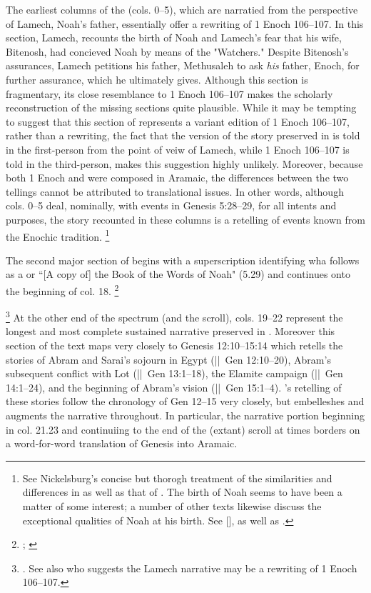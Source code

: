 The earliest columns of the \ga (cols. 0--5), which are narratied from the perspective of Lamech, Noah's father, essentially offer a rewriting of 1 Enoch 106--107.\autocite[174]{nickelsburg2005} In this section, Lamech, recounts the birth of Noah and Lamech's fear that his wife, Bitenosh, had concieved Noah by means of the  "Watchers." Despite Bitenosh's assurances, Lamech petitions his father, Methusaleh to ask \emph{his} father, Enoch, for further assurance, which he ultimately gives. Although this section is fragmentary, its close resemblance to 1 Enoch 106--107 makes the scholarly reconstruction of the missing sections quite plausible. While it may be tempting to suggest that this section of \ga represents a variant edition of 1 Enoch 106--107, rather than a rewriting, the fact that the version of the story preserved in \ga is told in the first-person from the point of veiw of Lamech, while 1 Enoch 106--107 is told in the third-person, makes this suggestion highly unlikely. Moreover, because both 1 Enoch and \ga were composed in Aramaic, the differences between the two tellings cannot be attributed to translational issues. In other words, although cols. 0--5 deal, nominally, with events in Genesis 5:28--29, for all intents and purposes, the story recounted in these columns is a retelling of events known from the Enochic tradition.%
%
\footnote{See Nickelsburg's concise but thorogh treatment of the similarities and differences in \cite[173--174]{nickelsburg2005} as well as that of \cite[122--123]{fitzmyer2004}. The birth of Noah seems to have been a matter of some interest; a number of other texts likewise discuss the exceptional qualities of Noah at his birth. See [],  as well as \cite{vanderkam_kapera1992}.} 

The second major section of \ga begins with a superscription identifying wha follows as a  or ``[A copy of] the Book of the Words of Noah" (5.29) and continues onto the beginning of col. 18.%
%
\footnote{\cite[174--175]{nickelsburg2005}; \cite[]{}}

%
\footnote{\cite[333]{bernstein_berthelot-etal2010}. See also \cite[174]{nickelsburg2005} who suggests the Lamech narrative may be a rewriting of 1 Enoch 106--107.}
At the other end of the spectrum (and the scroll), cols. 19--22 represent the longest and most complete sustained narrative preserved in \ga. Moreover this section of the text maps very closely to Genesis 12:10--15:14 which retells the stories of Abram and Sarai's sojourn in Egypt (||~Gen 12:10--20), Abram's subsequent conflict with Lot (||~Gen 13:1--18), the Elamite campaign (||~Gen 14:1--24), and the beginning of Abram's vision (||~Gen 15:1--4). \ga's retelling of these stories follow the chronology of Gen 12--15 very closely, but \ga embelleshes and augments the narrative throughout. In particular, the narrative portion beginning in col. 21.23 and continuiing to the end of the (extant) scroll at times borders on a word-for-word translation of Genesis into Aramaic.

